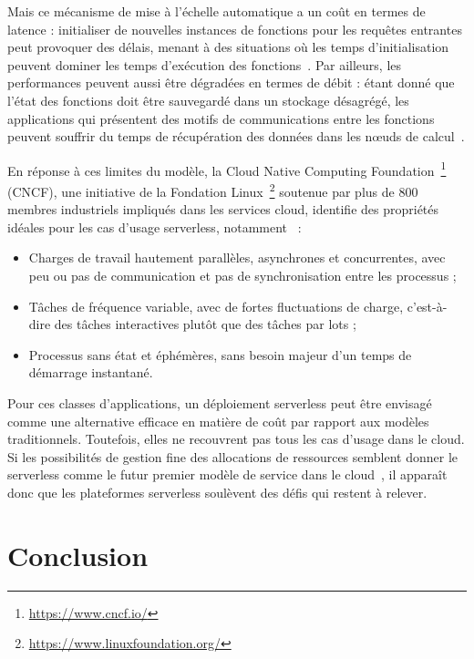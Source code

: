 Mais ce mécanisme de mise à l'échelle automatique a un coût en termes de latence : initialiser de nouvelles instances de fonctions pour les requêtes entrantes peut provoquer des délais, menant à des situations où les temps d'initialisation peuvent dominer les temps d'exécution des fonctions~\cite{Jiang2021TowardsDS}. Par ailleurs, les performances peuvent aussi être dégradées en termes de débit : étant donné que l'état des fonctions doit être sauvegardé dans un stockage désagrégé, les applications qui présentent des motifs de communications entre les fonctions peuvent souffrir du temps de récupération des données dans les nœuds de calcul~\cite{mullerLambadaInteractiveData2020}.

En réponse à ces limites du modèle, la Cloud Native Computing Foundation~\footnote{\href{https://www.cncf.io/}{https://www.cncf.io/}} (\gls{CNCF}), une initiative de la Fondation Linux~\footnote{\href{https://www.linuxfoundation.org/}{https://www.linuxfoundation.org/}} soutenue par plus de 800 membres industriels impliqués dans les services cloud, identifie des propriétés idéales pour les cas d'usage serverless, notamment~\cite{cncf2018whitepaper} :

\begin{itemize}
    \item Charges de travail hautement parallèles, asynchrones et concurrentes, avec peu ou pas de communication et pas de synchronisation entre les processus ;
    \item Tâches de fréquence variable, avec de fortes fluctuations de charge, c'est-à-dire des tâches interactives plutôt que des tâches par lots ;
    \item Processus sans état et éphémères, sans besoin majeur d'un temps de démarrage instantané.
\end{itemize}

Pour ces classes d'applications, un déploiement serverless peut être envisagé comme une alternative efficace en matière de coût par rapport aux modèles traditionnels. Toutefois, elles ne recouvrent pas tous les cas d'usage dans le cloud. Si les possibilités de gestion fine des allocations de ressources semblent donner le serverless comme le futur premier modèle de service dans le cloud~\cite{hellersteinServerlessComputingOne2019}, il apparaît donc que les plateformes serverless soulèvent des défis qui restent à relever.


\section{Conclusion}

